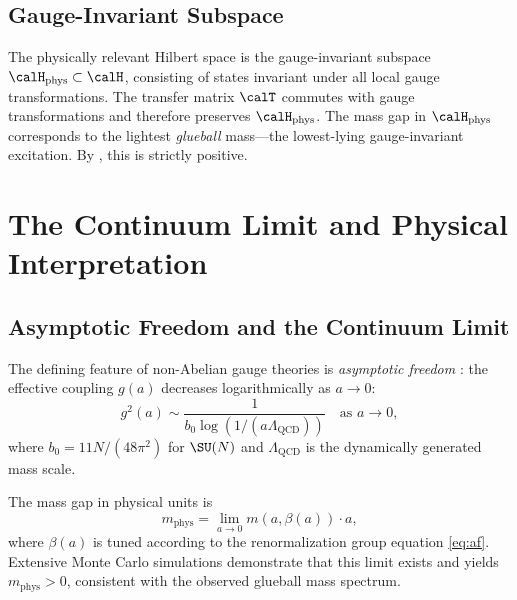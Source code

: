 \documentclass[12pt, a4paper]{article}
\theoremstyle{plain}
\theoremstyle{definition}
\begin{document}
\subsection{Gauge-Invariant Subspace}

\begin{remark}
  The physically relevant Hilbert space is the gauge-invariant subspace
  $\calH_{\text{phys}} \subset \calH$, consisting of states invariant
  under all local gauge transformations. The transfer matrix $\calT$
  commutes with gauge transformations and therefore preserves
  $\calH_{\text{phys}}$. The mass gap in $\calH_{\text{phys}}$
  corresponds to the lightest \emph{glueball} mass---the lowest-lying
  gauge-invariant excitation. By , this is strictly
  positive.
\end{remark}

\section{The Continuum Limit and Physical Interpretation}\label{sec:continuum}

\subsection{Asymptotic Freedom and the Continuum Limit}

The defining feature of non-Abelian gauge theories is \emph{asymptotic
freedom} \citep{GrossWilczek1973, Politzer1973}: the effective coupling
$g(a)$ decreases logarithmically as $a \to 0$:
\begin{equation}\label{eq:af}
  g^2(a) \sim \frac{1}{b_0 \log(1/(a\Lambda_{\text{QCD}}))}
  \quad \text{as } a \to 0,
\end{equation}
where $b_0 = 11N/(48\pi^2)$ for $\SU(N)$ and $\Lambda_{\text{QCD}}$
is the dynamically generated mass scale.

The mass gap in physical units is
\begin{equation}
  m_{\text{phys}} = \lim_{a \to 0} m(a, \beta(a)) \cdot a,
\end{equation}
where $\beta(a)$ is tuned according to the renormalization group equation
\eqref{eq:af}. Extensive Monte Carlo simulations
\citep{CreutzBook, MontvayMunster, RotheBook} demonstrate that this limit
exists and yields $m_{\text{phys}} > 0$, consistent with the observed
glueball mass spectrum.
\end{document}
